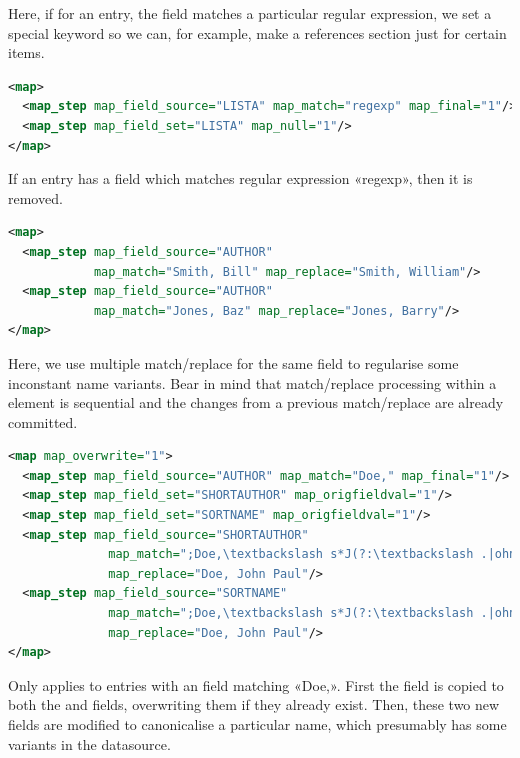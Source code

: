 \documentclass{ltxdockit}
\begin{document}
\noindent Here, if for an entry, the  field matches a
particular regular expression, we set a special keyword so we can, for
example, make a references section just for certain items.

\begin{lstlisting}[language=xml,escapechar=:,mathescape=true]
<map>
  <map_step map_field_source="LISTA" map_match="regexp" map_final="1"/>
  <map_step map_field_set="LISTA" map_null="1"/>
</map>
\end{lstlisting}

\noindent If an entry has a  field which matches regular
expression «regexp», then it is removed.

\begin{lstlisting}[language=xml,escapechar=:,mathescape=true]
<map>
  <map_step map_field_source="AUTHOR"
            map_match="Smith, Bill" map_replace="Smith, William"/>
  <map_step map_field_source="AUTHOR"
            map_match="Jones, Baz" map_replace="Jones, Barry"/>
</map>
\end{lstlisting}

\noindent Here, we use multiple match/replace for the same field to
regularise some inconstant name variants. Bear in mind that
match/replace processing within a  element is sequential and
the changes from a previous match/replace are already committed.

\begin{lstlisting}[language=xml,escapechar=;,mathescape=true]
<map map_overwrite="1">
  <map_step map_field_source="AUTHOR" map_match="Doe," map_final="1"/>
  <map_step map_field_set="SHORTAUTHOR" map_origfieldval="1"/>
  <map_step map_field_set="SORTNAME" map_origfieldval="1"/>
  <map_step map_field_source="SHORTAUTHOR"
              map_match=";Doe,\textbackslash s*J(?:\textbackslash .|ohn)(?:[-]*)(?:P\textbackslash .|Paul)*;"
              map_replace="Doe, John Paul"/>
  <map_step map_field_source="SORTNAME"
              map_match=";Doe,\textbackslash s*J(?:\textbackslash .|ohn)(?:[-]*)(?:P\textbackslash .|Paul)*;"
              map_replace="Doe, John Paul"/>
</map>
\end{lstlisting}

\noindent Only applies to entries with an  field matching
«Doe,». First the  field is copied to both the
 and  fields, overwriting them if they
already exist. Then, these two new fields are modified to canonicalise a
particular name, which presumably has some variants in the datasource.
\end{document}
